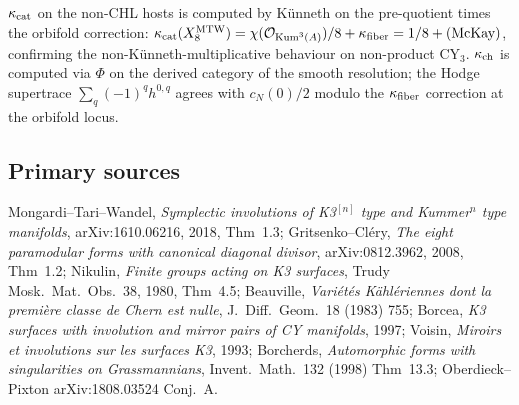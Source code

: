 $\kappa_{\mathrm{cat}}$ on the non-CHL hosts is computed by Künneth on the
pre-quotient times the orbifold correction: $\kappa_{\mathrm{cat}}(X_8^{\mathrm{MTW}})
=\chi(\mathcal{O}_{\mathrm{Kum}^3(A)})/8+\kappa_{\mathrm{fiber}}=1/8+\text{(McKay)}$, confirming
the non-Künneth-multiplicative behaviour on non-product CY$_3$.
$\kappa_{\mathrm{ch}}$ is computed via $\Phi$ on the derived category of the smooth
resolution; the Hodge supertrace $\sum_q(-1)^q h^{0,q}$ agrees with
$c_N(0)/2$ modulo the $\kappa_{\mathrm{fiber}}$ correction at the orbifold locus.

\subsection*{Primary sources}

Mongardi--Tari--Wandel, \emph{Symplectic involutions of K3$^{[n]}$
type and Kummer$^{n}$ type manifolds}, arXiv:1610.06216, 2018,
Thm~1.3; Gritsenko--Cl\'ery, \emph{The eight paramodular forms
with canonical diagonal divisor}, arXiv:0812.3962, 2008, Thm~1.2;
Nikulin, \emph{Finite groups acting on K3 surfaces}, Trudy Mosk.\
Mat.\ Obs.\ 38, 1980, Thm~4.5; Beauville, \emph{Variétés Kählériennes
dont la première classe de Chern est nulle}, J.~Diff.\ Geom.\ 18
(1983) 755; Borcea, \emph{K3 surfaces with involution and mirror
pairs of CY manifolds}, 1997; Voisin, \emph{Miroirs et involutions
sur les surfaces K3}, 1993; Borcherds, \emph{Automorphic forms
with singularities on Grassmannians}, Invent.\ Math.\ 132 (1998)
Thm~13.3; Oberdieck--Pixton arXiv:1808.03524 Conj.~A.
